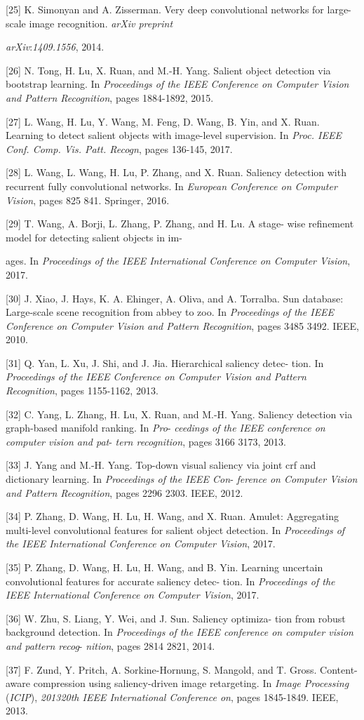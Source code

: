 \documentclass[a4paper,10pt]{article}
\begin{document}
[25] K. Simonyan and A. Zisserman. Very deep convolutional networks for large-scale image recognition. {\it arXiv preprint}
\begin{center}
{\it arXiv}:{\it 1409.1556}, 2014.
\end{center}
[26] N. Tong, H. Lu, X. Ruan, and M.-H. Yang. Salient object detection via bootstrap learning. In {\it Proceedings of the IEEE Conference on Computer Vision and Pattern Recognition}, pages 1884-1892, 2015.

[27] L. Wang, H. Lu, Y. Wang, M. Feng, D. Wang, B. Yin, and X. Ruan. Learning to detect salient objects with image-level supervision. In {\it Proc. IEEE Conf. Comp. Vis. Patt. Recogn}, pages 136-145, 2017.

[28] L. Wang, L. Wang, H. Lu, P. Zhang, and X. Ruan. Saliency detection with recurrent fully convolutional networks. In {\it European Conference on Computer Vision}, pages 825 841. Springer, 2016.

[29] T. Wang, A. Borji, L. Zhang, P. Zhang, and H. Lu. A stage- wise refinement model for detecting salient objects in im-

ages. In {\it Proceedings of the IEEE International Conference on Computer Vision}, 2017.

[30] J. Xiao, J. Hays, K. A. Ehinger, A. Oliva, and A. Torralba. Sun database: Large-scale scene recognition from abbey to zoo. In {\it Proceedings of the IEEE Conference on Computer Vision and Pattern Recognition}, pages 3485 3492. IEEE, 2010.

[31] Q. Yan, L. Xu, J. Shi, and J. Jia. Hierarchical saliency detec- tion. In {\it Proceedings of the IEEE Conference on Computer Vision and Pattern Recognition}, pages 1155-1162, 2013.

[32] C. Yang, L. Zhang, H. Lu, X. Ruan, and M.-H. Yang. Saliency detection via graph-based manifold ranking. In {\it Pro}- {\it ceedings of the IEEE conference on computer vision and pat}- {\it tern recognition}, pages 3166 3173, 2013.

[33] J. Yang and M.-H. Yang. Top-down visual saliency via joint crf and dictionary learning. In {\it Proceedings of the IEEE Con}- {\it ference on Computer Vision and Pattern Recognition}, pages 2296 2303. IEEE, 2012.

[34] P. Zhang, D. Wang, H. Lu, H. Wang, and X. Ruan. Amulet: Aggregating multi-level convolutional features for salient object detection. In {\it Proceedings of the IEEE International Conference on Computer Vision}, 2017.

[35] P. Zhang, D. Wang, H. Lu, H. Wang, and B. Yin. Learning uncertain convolutional features for accurate saliency detec- tion. In {\it Proceedings of the IEEE International Conference on Computer Vision}, 2017.

[36] W. Zhu, S. Liang, Y. Wei, and J. Sun. Saliency optimiza- tion from robust background detection. In {\it Proceedings of the IEEE conference on computer vision and pattern recog}- {\it nition}, pages 2814 2821, 2014.

[37] F. Zund, Y. Pritch, A. Sorkine-Hornung, S. Mangold, and T. Gross. Content-aware compression using saliency-driven image retargeting. In {\it Image Processing} ({\it ICIP}), {\it 201320th IEEE International Conference on}, pages 1845-1849. IEEE, 2013.
\end{document}
